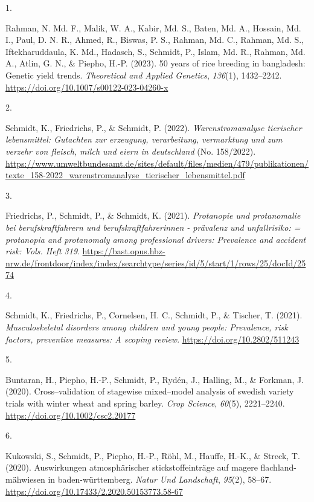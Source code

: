 \documentclass[11pt,a4paper,]{awesome-cv}
\newlength{\cslhangindent}
\newlength{\csllabelwidth}
\newenvironment{CSLReferences}[2] %
 {\begin{list}{}{%
  \setlength{\itemindent}{0pt}
  \setlength{\leftmargin}{0pt}
  \setlength{\parsep}{0pt}
  \ifodd #1
   \setlength{\leftmargin}{\cslhangindent}
   \setlength{\itemindent}{-1\cslhangindent}
  \fi
  \setlength{\itemsep}{#2\baselineskip}}}
 {\end{list}}
\newcommand{\CSLLeftMargin}[1]{\parbox[t]{\csllabelwidth}{\strut#1\strut}}
\newcommand{\CSLRightInline}[1]{\parbox[t]{\linewidth - \csllabelwidth}{\strut#1\strut}}
\begin{document}
\label{refs-05edd058f864cc46622ea89eaad96586}
\begin{CSLReferences}{0}{0}
\CSLLeftMargin{1. }%
\CSLRightInline{Rahman, N. Md. F., Malik, W. A., Kabir, Md. S., Baten,
Md. A., Hossain, Md. I., Paul, D. N. R., Ahmed, R., Biswas, P. S.,
Rahman, Md. C., Rahman, Md. S., Iftekharuddaula, K. Md., Hadasch, S.,
Schmidt, P., Islam, Md. R., Rahman, Md. A., Atlin, G. N., \& Piepho,
H.-P. (2023). 50 years of rice breeding in bangladesh: Genetic yield
trends. \emph{Theoretical and Applied Genetics}, \emph{136}(1),
1432--2242. \url{https://doi.org/10.1007/s00122-023-04260-x}}

\CSLLeftMargin{2. }%
\CSLRightInline{Schmidt, K., Friedrichs, P., \& Schmidt, P. (2022).
\emph{Warenstromanalyse tierischer lebensmittel: Gutachten zur
erzeugung, verarbeitung, vermarktung und zum verzehr von fleisch, milch
und eiern in deutschland} (No. 158/2022).
\url{https://www.umweltbundesamt.de/sites/default/files/medien/479/publikationen/texte_158-2022_warenstromanalyse_tierischer_lebensmittel.pdf}}

\CSLLeftMargin{3. }%
\CSLRightInline{Friedrichs, P., Schmidt, P., \& Schmidt, K. (2021).
\emph{Protanopie und protanomalie bei berufskraftfahrern und
berufskraftfahrerinnen - prävalenz und unfallrisiko: = protanopia and
protanomaly among professional drivers: Prevalence and accident risk:
Vols. Heft 319}.
\url{https://bast.opus.hbz-nrw.de/frontdoor/index/index/searchtype/series/id/5/start/1/rows/25/docId/2574}}

\CSLLeftMargin{4. }%
\CSLRightInline{Schmidt, K., Friedrichs, P., Cornelsen, H. C., Schmidt,
P., \& Tischer, T. (2021). \emph{Musculoskeletal disorders among
children and young people: Prevalence, risk factors, preventive
measures: A scoping review}. \url{https://doi.org/10.2802/511243}}

\CSLLeftMargin{5. }%
\CSLRightInline{Buntaran, H., Piepho, H.-P., Schmidt, P., Rydén, J.,
Halling, M., \& Forkman, J. (2020). Cross--validation of stagewise
mixed--model analysis of swedish variety trials with winter wheat and
spring barley. \emph{Crop Science}, \emph{60}(5), 2221--2240.
\url{https://doi.org/10.1002/csc2.20177}}

\CSLLeftMargin{6. }%
\CSLRightInline{Kukowski, S., Schmidt, P., Piepho, H.-P., Röhl, M.,
Hauffe, H.-K., \& Streck, T. (2020). Auswirkungen atmosphärischer
stickstoffeinträge auf magere flachland-mähwiesen in baden-württemberg.
\emph{Natur Und Landschaft}, \emph{95}(2), 58--67.
\url{https://doi.org/10.17433/2.2020.50153773.58-67}}


\end{CSLReferences}
\end{document}
